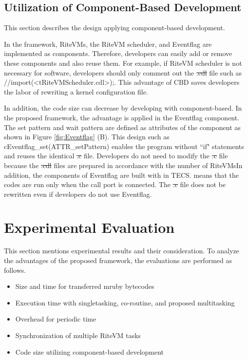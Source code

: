 \documentclass{sig-alternate-05-2015}
\providecommand{\DIFadd}[1]{{\protect\color{blue}\uwave{#1}}} %
\providecommand{\DIFdel}[1]{{\protect\color{red}\sout{#1}}}                      %
\providecommand{\DIFaddbegin}{} %
\providecommand{\DIFaddend}{} %
\providecommand{\DIFdelbegin}{} %
\providecommand{\DIFdelend}{} %
\begin{document}
\subsection{Utilization of Component-Based Development}
This section describes the design applying component-based development.

In the framework, RiteVMs, the RiteVM scheduler, and Eventflag are implemented as components.
Therefore, developers can easily add or remove these components and also reuse them.
For example, if RiteVM scheduler is not necessary for software, developers should only comment out the \DIFdelbegin \DIFdel{.cdl }\DIFdelend \DIFaddbegin \DIFadd{CDL }\DIFaddend file such as {\myit //import(<tRiteVMScheduler.cdl>);}.
This advantage of CBD saves developers the labor of rewriting a kernel configuration file.

In addition, the code size can decrease by developing with component-based. 
In the proposed framework, the advantage is applied in the Eventflag component.
The set pattern and wait pattern are defined as attributes of the component as shown in Figure \ref{fig:Eventflag} (B).
This design such as {\myit cEventflag\_set(ATTR\_setPattern)} enables the program without ``if" statements and reuses the identical \DIFdelbegin \DIFdel{.c }\DIFdelend \DIFaddbegin \DIFadd{C }\DIFaddend file.
Developers do not need to modify the \DIFdelbegin \DIFdel{.c }\DIFdelend \DIFaddbegin \DIFadd{C }\DIFaddend file because the \DIFdelbegin \DIFdel{.cdl }\DIFdelend \DIFaddbegin \DIFadd{CDL }\DIFaddend files are prepared in accordance with the number of RiteVMs\DIFaddbegin \DIFadd{.
}\DIFaddend In addition, the components of Eventflag are built with {\myit [optional]} in TECS.
{\myit [optional]} means that the codes are run only when the call port is connected.
The \DIFdelbegin \DIFdel{.c }\DIFdelend \DIFaddbegin \DIFadd{C }\DIFaddend file does not be rewritten even if developers do not use Eventflag. 

\section{Experimental Evaluation}
\label{sec:Evaluation}
This section mentions experimental results and their consideration.
To analyze the advantages of the proposed framework, the evaluations are performed as follows.
\begin{itemize}
    \item Size and time for transferred mruby bytecodes
    \item Execution time with singletasking, co-routine, and proposed multitasking
    \item Overhead for periodic time
    \item Synchronization of multiple RiteVM tasks
    \item Code size utilizing component-based development 
\end{itemize}
\end{document}
